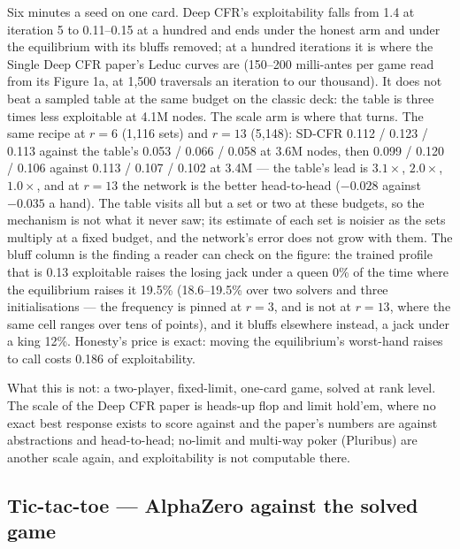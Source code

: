 \noindent Six minutes a seed on one card. Deep CFR's exploitability falls from 1.4 at
iteration 5 to 0.11--0.15 at a hundred and ends under the honest arm and under the
equilibrium with its bluffs removed; at a hundred iterations it is where the Single
Deep CFR paper's Leduc curves are (150--200 milli-antes per game read from its Figure
1a, at 1,500 traversals an iteration to our thousand). It does not beat a sampled table
at the same budget on the classic deck: the table is three times less exploitable at
4.1M nodes. The scale arm is where that turns. The same recipe at $r = 6$ (1,116 sets)
and $r = 13$ (5,148): SD-CFR 0.112 / 0.123 / 0.113 against the table's 0.053 / 0.066 /
0.058 at 3.6M nodes, then 0.099 / 0.120 / 0.106 against 0.113 / 0.107 / 0.102 at 3.4M ---
the table's lead is $3.1\times$, $2.0\times$, $1.0\times$, and at $r = 13$ the network is
the better head-to-head ($-0.028$ against $-0.035$ a hand). The table visits all but a
set or two at these budgets, so the mechanism is not what it never saw; its estimate of each set
is noisier as the sets multiply at a fixed budget, and the network's error does not grow
with them. The bluff column is the finding a reader can check on the figure: the
trained profile that is 0.13 exploitable raises the losing jack under a queen 0\% of
the time where the equilibrium raises it 19.5\% (18.6--19.5\% over two solvers and
three initialisations --- the frequency is pinned at $r = 3$, and is not at $r = 13$,
where the same cell ranges over tens of points), and it bluffs elsewhere instead, a jack
under a king 12\%. Honesty's price is exact: moving the equilibrium's worst-hand raises
to call costs 0.186 of exploitability.

What this is not: a two-player, fixed-limit, one-card game, solved at rank level. The
scale of the Deep CFR paper is heads-up flop and limit hold'em, where no exact best
response exists to score against and the paper's numbers are against abstractions and
head-to-head; no-limit and multi-way poker (Pluribus) are another scale again, and
exploitability is not computable there.

\subsection{Tic-tac-toe --- AlphaZero against the solved game}
\label{sec:game_ttt}

